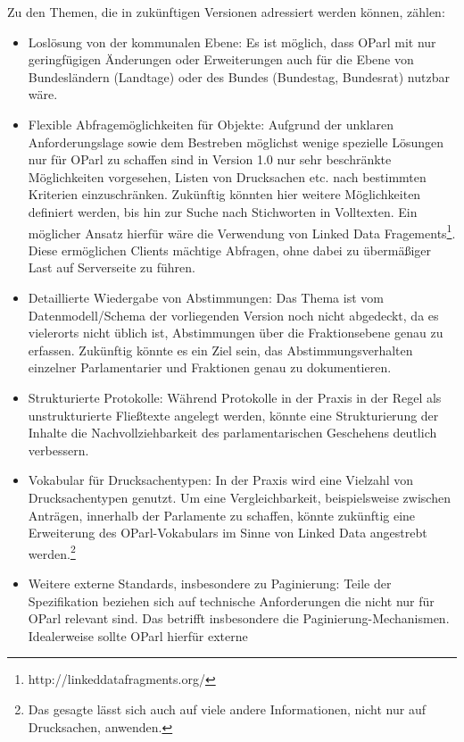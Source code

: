 \documentclass[,a4paper]{article}
\begin{document}
Zu den Themen, die in zukünftigen Versionen adressiert werden können,
zählen:

\begin{itemize}
\item
  Loslösung von der kommunalen Ebene: Es ist möglich, dass OParl mit nur
  geringfügigen Änderungen oder Erweiterungen auch für die Ebene von
  Bundesländern (Landtage) oder des Bundes (Bundestag, Bundesrat)
  nutzbar wäre.
\item
  Flexible Abfragemöglichkeiten für Objekte: Aufgrund der unklaren
  Anforderungslage sowie dem Bestreben möglichst wenige spezielle
  Lösungen nur für OParl zu schaffen sind in Version 1.0 nur sehr
  beschränkte Möglichkeiten vorgesehen, Listen von Drucksachen etc. nach
  bestimmten Kriterien einzuschränken. Zukünftig könnten hier weitere
  Möglichkeiten definiert werden, bis hin zur Suche nach Stichworten in
  Volltexten. Ein möglicher Ansatz hierfür wäre die Verwendung von
  Linked Data Fragements\footnote{http://linkeddatafragments.org/}.
  Diese ermöglichen Clients mächtige Abfragen, ohne dabei zu übermäßiger
  Last auf Serverseite zu führen.
\item
  Detaillierte Wiedergabe von Abstimmungen: Das Thema ist vom
  Datenmodell/Schema der vorliegenden Version noch nicht abgedeckt, da
  es vielerorts nicht üblich ist, Abstimmungen über die Fraktionsebene
  genau zu erfassen. Zukünftig könnte es ein Ziel sein, das
  Abstimmungsverhalten einzelner Parlamentarier und Fraktionen genau zu
  dokumentieren.
\item
  Strukturierte Protokolle: Während Protokolle in der Praxis in der
  Regel als unstrukturierte Fließtexte angelegt werden, könnte eine
  Strukturierung der Inhalte die Nachvollziehbarkeit des
  parlamentarischen Geschehens deutlich verbessern.
\item
  Vokabular für Drucksachentypen: In der Praxis wird eine Vielzahl von
  Drucksachentypen genutzt. Um eine Vergleichbarkeit, beispielsweise
  zwischen Anträgen, innerhalb der Parlamente zu schaffen, könnte
  zukünftig eine Erweiterung des OParl-Vokabulars im Sinne von Linked
  Data angestrebt werden.\footnote{Das gesagte lässt sich auch auf viele
    andere Informationen, nicht nur auf Drucksachen, anwenden.}
\item
  Weitere externe Standards, insbesondere zu Paginierung: Teile der
  Spezifikation beziehen sich auf technische Anforderungen die nicht nur
  für OParl relevant sind. Das betrifft insbesondere die
  Paginierung-Mechanismen. Idealerweise sollte OParl hierfür externe

\end{itemize}
\end{document}
